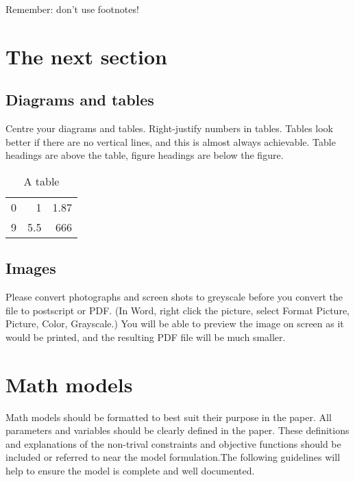 \documentclass[12pt]{ORSNZ}
\begin{document}
Remember: don't use footnotes!


\section{The next section}

\subsection{Diagrams and tables}
Centre your diagrams and tables. Right-justify numbers in tables.
Tables look better if there are no vertical lines, and this is almost
always achievable. Table headings are above the table, figure headings
are below the figure.

\begin{center}

\begin{table}[h]
\caption{A table}
\vspace{0.5ex}

\begin{center}
\begin{tabular}{r r r}
\hline
0 & 1 & 1.87 \\
9 & 5.5 & 666 \\
\hline
\end{tabular}
\end{center}

\end{table}

\end{center}

\subsection{Images}

Please convert photographs and screen shots to greyscale before you convert
the file to postscript or PDF. (In Word, right click the picture, select
Format Picture, Picture, Color, Grayscale.) You will be able to preview the
image on screen as it would be printed, and the resulting PDF file will be
much smaller.

\section{Math models}
Math models should be formatted to best suit their purpose in the
paper. All parameters and variables should be clearly defined in the
paper. These definitions and explanations of the non-trival constraints
and objective functions should be included or referred to near the
model formulation.The following guidelines will help to ensure the
model is complete and well documented.
\end{document}
